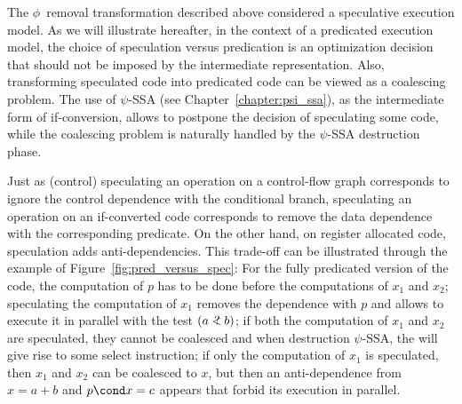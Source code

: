 The $\phi$~removal transformation described above considered a speculative execution model. 
As we will illustrate hereafter, in the context of a predicated execution model, the choice of speculation versus predication is an optimization decision that should not be imposed by the intermediate representation. 
Also, transforming speculated code into predicated code can be viewed as a coalescing problem. 
The use of $\psi$-SSA (see Chapter~\ref{chapter:psi_ssa}), as the intermediate form of if-conversion, allows to postpone the decision of speculating some code, while the coalescing problem is naturally handled by the $\psi$-SSA destruction phase.

Just as (control) speculating an operation on a control-flow graph corresponds to ignore the control dependence with the conditional branch, speculating an operation on an if-converted code corresponds to remove the data dependence with the corresponding predicate. 
On the other hand, on register allocated code, speculation adds anti-dependencies. 
This trade-off can be illustrated through the example of Figure~\ref{fig:pred_versus_spec}: 
For the fully predicated version of the code, the computation of $p$ has to be done before the computations of $x_1$ and $x_2$; 
speculating the computation of $x_1$ removes the dependence with $p$ and allows to execute it in parallel with the test $(a<\hspace{-.6em}?\ b)$; 
if both the computation of $x_1$ and $x_2$ are speculated, they cannot be coalesced and when destruction $\psi$-SSA, the \psifun\index{\psifun} will give rise to some select instruction; 
if only the computation of $x_1$ is speculated, then $x_1$ and $x_2$ can be coalesced to $x$, but then an anti-dependence from $x=a+b$ and $p\cond x = c $ appears that forbid its execution in parallel.

